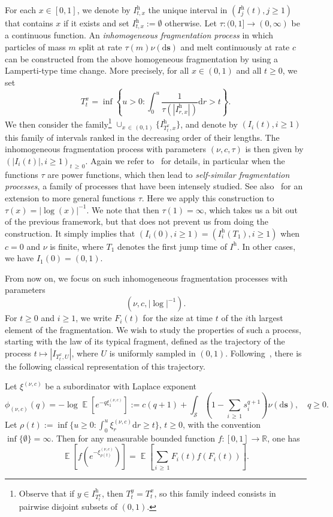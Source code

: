 \documentclass[AHL,Unicode,longabstracts,published]{cedram}
\newcommand{\R}{\mathbb{R}}
\DeclareMathOperator{\E}{\mathbb{E}}
\newcommand{\h}{\mathrm{h}}
\newcommand{\dd}{\mathrm{d}}
\newcommand{\calS}{\mathcal{S}}
\newcommand{\bfs}{\mathbf{s}}
\begin{document}
For each $x \in [0,1]$, we denote by $I^\h_{t,x}$ the unique interval in $(I^\h_j(t), j \geq 1)$ that contains $x$ if it exists and set $I^\h_{t,x}:=\emptyset$ otherwise. Let $\tau:(0,1] \to (0,\infty)$ be a continuous function. An \emph{inhomogeneous fragmentation process} in which particles of mass $m$ split at rate $\tau(m) \nu(\dd \bfs)$ and melt continuously at rate $c$ can be constructed from the above homogeneous fragmentation by using a Lamperti-type time change. More precisely, for all $x \in (0,1)$ and all $t\geq 0$, we set
\begin{equation}\label{time_change_tau}
T^x_t = \inf\left\{u > 0 : \int_0^u \frac{1}{\tau\left(|I^\h_{r,x}|\right)}\dd r >t\right\}.
\end{equation}
We then consider the family\footnote{Observe that if $y \in I^\h_{T^x_t}$, then $T^y_t = T^x_t$, so this family indeed consists in pairwise disjoint subsets of $(0,1)$.} $\cup_{x\,\in\,(0,1)} \{I^\h_{T^x_t,x}\}$, and denote by $(I_i(t), i \geq 1)$ this family of intervals ranked in the decreasing order of their lengths. The inhomogeneous fragmentation process with parameters $(\nu,c,\tau)$ is then given by $(|I_i(t)|, i \geq 1)_{t\,\geq\,0}$. Again we refer to~\cite{BertoinSSF} for details, in particular when the functions $\tau$ are power functions, which then lead to \emph{self-similar fragmentation processes}, a family of processes that have been intensely studied. See also~\cite{H03} for an extension to more general functions $\tau$. Here we apply this construction to $\tau(x)=|\log(x)|^{-1}$. We note that then $\tau(1)=\infty$, which takes us a bit out of the previous framework, but that does not prevent us from doing the construction. It simply implies that $(I_i(0), i \geq 1)=(I^{\h}_i(T_1), i \geq 1)$ when $c=0$ and $\nu$ is finite, where $T_1$ denotes the first jump time of $I^\h$. In other cases, we have $I_1(0) = (0,1)$.

From now on, we focus on such inhomogeneous fragmentation processes with parameters
\[
\left(\nu, c,|\log |^{-1}\right).
\]
For $t \geq 0$ and $i \geq 1$, we write $F_i(t)$ for the size at time $t$ of the $i$th largest element of the fragmentation. We wish to study the properties of such a process, starting with the law of its typical fragment, defined as the trajectory of the process $t \mapsto |I_{T^{x}_t,U}|$, where $U$ is uniformly sampled in $(0,1)$. Following~\cite{BertoinSSF,H03}, there is the following classical representation of this trajectory.

\begin{prop}\label{prop:taggedFragment}
Let $\xi^{(\nu,c)}$ be a subordinator with Laplace exponent
\[
\phi_{(\nu,c)}(q)= - \log \E\left[e^{-q \xi^{(\nu,c)}_1}\right] := c(q+1)+\int_{\calS} \left(1-\sum_{i\,\geq\,1}s_i^{q+1}\right)\nu(\dd \bfs), \quad q\geq 0.
\]
Let $\rho(t) := \inf \{ u \geq 0 : \int_0^u \xi^{(\nu,c)}_r \dd r \geq t \}$, $t\geq 0$, with the convention $\inf\{\emptyset\}=\infty$. Then for any measurable bounded function $f:[0,1] \rightarrow \R $, one has
\[
\E\left[f\left(e^{-\xi^{(\nu,c)}_{\rho(t)}}\right) \right] = \E\left[\sum_{i\,\geq\,1} F_i(t) f\left(F_i(t)\right) \right].
\]
\end{prop}
\end{document}
